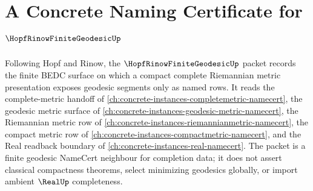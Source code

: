 \chapter{A Concrete Naming Certificate for $\HopfRinowFiniteGeodesicUp$}
\label{ch:concrete-instances-hopf-rinow-finite-geodesic-namecert}

Following Hopf and Rinow, the $\HopfRinowFiniteGeodesicUp$ packet records the finite BEDC surface on which a compact complete Riemannian metric presentation exposes geodesic segments only as named rows. It reads the complete-metric handoff of \autoref{ch:concrete-instances-completemetric-namecert}, the geodesic metric surface of \autoref{ch:concrete-instances-geodesic-metric-namecert}, the Riemannian metric row of \autoref{ch:concrete-instances-riemannianmetric-namecert}, the compact metric row of \autoref{ch:concrete-instances-compactmetric-namecert}, and the Real readback boundary of \autoref{ch:concrete-instances-real-namecert}. The packet is a finite geodesic NameCert neighbour for completion data; it does not assert classical compactness theorems, select minimizing geodesics globally, or import ambient $\RealUp$ completeness.

